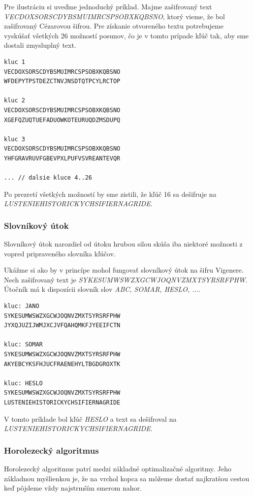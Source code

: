 Pre ilustráciu si uveďme jednoduchý príklad. Majme zašifrovaný text \textit{VECDOXSORSCDYBSMUIMRCSPSOBXKQBSNO}, ktorý vieme,
že bol zašifrovaný Cézarovou šifrou.
Pre získanie otvoreného textu potrebujeme vyskúšať všetkých 26 možností posunov, čo je v tomto prípade kľúč tak, aby sme dostali zmysluplný text.

\begin{lstlisting}
kluc 1
VECDOXSORSCDYBSMUIMRCSPSOBXKQBSNO
WFDEPYTPSTDEZCTNVJNSDTQTPCYLRCTOP
  
kluc 2
VECDOXSORSCDYBSMUIMRCSPSOBXKQBSNO
XGEFQZUQTUEFADUOWKOTEURUQDZMSDUPQ
 
kluc 3
VECDOXSORSCDYBSMUIMRCSPSOBXKQBSNO
YHFGRAVRUVFGBEVPXLPUFVSVREANTEVQR

... // dalsie kluce 4..26
\end{lstlisting}

Po prezretí všetkých možností by sme zistili, že kľúč 16 sa dešifruje na \textit{LUSTENIEHISTORICKYCHSIFIERNAGRIDE}.

\subsubsection{Slovníkový útok}
Slovníkový útok narozdiel od útoku hrubou silou skúša iba niektoré možnosti z vopred pripraveného slovníka kľúčov.

Ukážme si ako by v princípe mohol fungovať slovníkový útok na šifru Vigenere.
Nech zašifrovaný text je \textit{SYKESUMWSWZXGCWJOQNVZMXTSYRSRFPHW}. Útočník má k dispozícii slovník slov \textit{ABC, SOMAR, HESLO, ...}.

\begin{lstlisting}
kluc: JANO
SYKESUMWSWZXGCWJOQNVZMXTSYRSRFPHW
JYXQJUZIJWMJXCJVFQAHQMKFJYEEIFCTN

kluc: SOMAR
SYKESUMWSWZXGCWJOQNVZMXTSYRSRFPHW
AKYEBCYKSFHJUCFRAENEHYLTBGDGROXTK

kluc: HESLO
SYKESUMWSWZXGCWJOQNVZMXTSYRSRFPHW
LUSTENIEHISTORICKYCHSIFIERNAGRIDE
\end{lstlisting}

V tomto príklade bol kľúč \textit{HESLO} a text sa dešifroval na \textit{LUSTENIEHISTORICKYCHSIFIERNAGRIDE}.
\subsubsection{Horolezecký algoritmus}
Horolezecký algoritmus patrí medzi základné optimalizačné algoritmy.
Jeho základnou myšlienkou je, že na vrchol kopca sa môžeme dostať najkratšou cestou keď pôjdeme vždy najstrmším smerom nahor.

